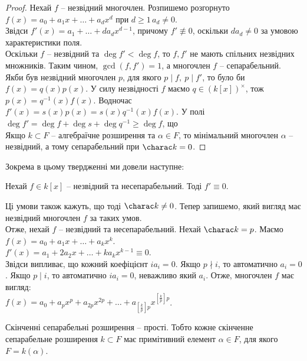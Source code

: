 \documentclass{math_library}
\begin{document}
\begin{proof}
Нехай $f$ -- незвідний многочлен. Розпишемо розгорнуто\\
$f(x) = a_0 + a_1 x + \dots + a_d x^d$ при $d \geq 1\, a_d \neq 0$.\\
Звідси $f'(x) = a_1 + \dots + d a_d x^{d-1}$, причому $f' \not\equiv 0$, оскільки $da_d \neq 0$ за умовою характеристики поля.\\
Оскільки $f$ -- незвідний та $\deg f' < \deg f$, то $f,f'$ не мають спільних незвідних множників. Таким чином, $\gcd(f,f') = 1$, а многочлен $f$ -- сепарабельний.\\
Якби був незвідний многочлен $p$, для якого $p \mid f,\ p \mid f'$, то було би $f(x) = q(x) p(x)$. У силу незвідності $f$ маємо $q \in (k[x])^\times$, тож $p(x) = q^{-1}(x)f(x)$. Водночас $f'(x) = s(x)p(x) = s(x)q^{-1}(x)f(x)$. У полі $\deg f' = \deg f + \deg s + \deg q^{-1} \geq \deg f$, що
\bigskip \\
Якщо $k \subset F$ -- алгебраїчне розширення та $\alpha \in F$, то мінімальний многочлен $\alpha$ -- незвідний, а тому сепарабельний при $\charac k = 0$.
\end{proof}

Зокрема в цьому твердженні ми довели наступне:
\begin{proposition}
Нехай $f \in k[x]$ -- незвідний та несепарабельний. Тоді $f' \equiv 0$.
\end{proposition}
Ці умови також кажуть, що тоді $\charac k \neq 0$. Тепер запишемо, який вигляд має незвідний многочлен $f$ за таких умов. \\
Отже, нехай $f$ -- незвідний та несепарабельний. Нехай $\charac k = p$. Маємо\\
$f(x) = a_0 + a_1 x + \dots + a_k x^k$.\\
$f'(x) = a_1 + 2 a_2 x + \dots + k a_k x^{k-1} \equiv 0$.\\
Звідси випливає, що кожний коефіцієнт $i a_i = 0$. Якщо $p \nmid i$, то автоматично $a_i = 0$. Якщо $p \mid i$, то автоматично $i a_i = 0$, неважливо який $a_i$. Отже, многочлен $f$ має вигляд:\\
$f(x) = a_0 + a_p x^p + a_{2p} x^{2p} + \dots + a_{\left[ \frac{k}{p}\right] p} x^{\left[ \frac{k}{p}\right] p}$.


\begin{theorem}
Скінченні сепарабельні розширення -- прості. Тобто кожне скінченне сепарабельне розширення $k \subset F$ має примітивний елемент $\alpha \in F$, для якого $F = k(\alpha)$.
\end{theorem}
\end{document}

